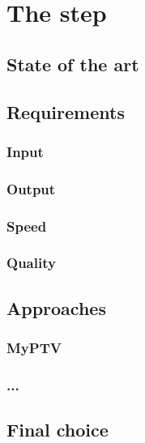 \chapter{The \linkDDD* step}
\label{chap:3dlink}

\section{State of the art}
\section{Requirements}

\subsection{Input}
\subsection{Output}
\subsection{Speed}
\subsection{Quality}
\section{Approaches}
\subsection{MyPTV}
\subsection{...}
\section{Final choice}
